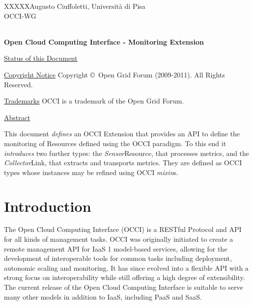 \documentclass[10pt,a4paper]{article}
\newcommand{\doccode}{XXXXX}
\begin{document}
\thispagestyle{empty}

\doccode \hfill Augusto Ciuffoletti, Università di Pisa\\ 
OCCI-WG\\
\\

\vspace*{0.5in}

\begin{Large}
\textbf{Open Cloud Computing Interface - Monitoring Extension}
\end{Large}

\vspace*{0.5in}

\newcommand{\rem}[2]{}

\newcommand{\oc}[0]{\tt OCCI}
\newcommand{\mi}[0]{{\em mixin}}
\newcommand{\metr}[0]{{\em metric}}
\newcommand{\aggr}[0]{{\em aggregator}}
\newcommand{\publ}[0]{{\em publisher}}
\newcommand{\ent}[0]{{\em Entity}}
\newcommand{\rs}[0]{{\em Resource}}
\renewcommand{\ln}[0]{{\em Link}}
\newcommand{\sens}[0]{{\em Sensor}}
\newcommand{\comp}[0]{{\em Compute}}
\newcommand{\coll}[0]{{\em Collector}}

\underline{Status of this Document}


\underline{Copyright Notice}
Copyright \copyright ~Open Grid Forum (2009-2011). All Rights Reserved.

\underline{Trademarks}
OCCI is a trademark of the Open Grid Forum.

\underline{Abstract}


This document {\em defines} an OCCI Extension that provides an API to define the monitoring of Resources defined using the OCCI paradigm. To this end it {\em introduces} two further types: the \sens Resource, that processes metrics, and the \coll Link, that extracts and transports metrics. They are defined as OCCI types whose instances may be refined using OCCI \mi s.

\newpage
\tableofcontents
\newpage

\section{Introduction}

The Open Cloud Computing Interface (OCCI) is a RESTful Protocol and API for all kinds of management tasks. OCCI was originally initiated to create a remote management API for IaaS 1 model-based services, allowing for the development of interoperable tools for common tasks including deployment, autonomic scaling
and monitoring. It has since evolved into a flexible API with a strong focus on interoperability while still offering a high degree of extensibility. The current release of the Open Cloud Computing Interface is suitable to serve many other models in addition to IaaS, including PaaS and SaaS.
\end{document}
